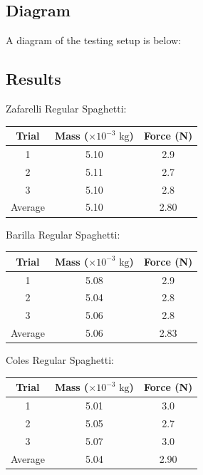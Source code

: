 \documentclass[a4paper,11pt]{article}
\begin{document}
\subsection{Diagram}

A diagram of the testing setup is below:

\vspace{5cm}


\subsection{Results}

Zafarelli Regular Spaghetti:

\begin{center}
\begin{tabular}{|c|c|c|}
\hline
Trial & Mass ($\times 10^{-3}\mbox{ kg}$) & Force (N) \\
\hline
1       & 5.10 & 2.9 \\
2       & 5.11 & 2.7 \\
3       & 5.10 & 2.8 \\
\hline
Average & 5.10 & 2.80 \\
\hline
\end{tabular}
\end{center}

Barilla Regular Spaghetti:

\begin{center}
\begin{tabular}{|c|c|c|}
\hline
Trial & Mass ($\times 10^{-3}\mbox{ kg}$) & Force (N) \\
\hline
1       & 5.08 & 2.9 \\
2       & 5.04 & 2.8 \\
3       & 5.06 & 2.8 \\
\hline
Average & 5.06 & 2.83 \\
\hline
\end{tabular}
\end{center}

Coles Regular Spaghetti:

\begin{center}
\begin{tabular}{|c|c|c|}
\hline
Trial & Mass ($\times 10^{-3}\mbox{ kg}$) & Force (N) \\
\hline
1       & 5.01 & 3.0 \\
2       & 5.05 & 2.7 \\
3       & 5.07 & 3.0 \\
\hline
Average & 5.04 & 2.90 \\
\hline
\end{tabular}
\end{center}
\end{document}
